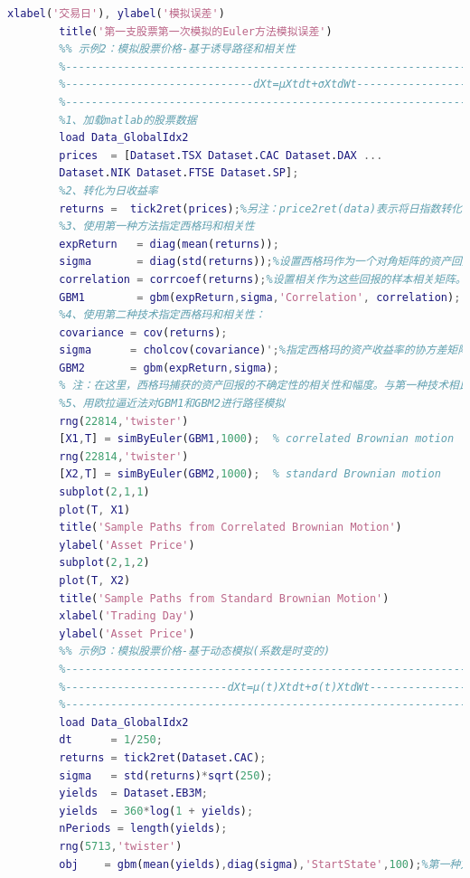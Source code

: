\begin{lstlisting}[language= Matlab]
        xlabel('交易日'), ylabel('模拟误差')
        title('第一支股票第一次模拟的Euler方法模拟误差')
        %% 示例2：模拟股票价格-基于诱导路径和相关性
        %---------------------------------------------------------------%
        %-----------------------------dXt=μXtdt+σXtdWt------------------%
        %---------------------------------------------------------------%
        %1、加载matlab的股票数据
        load Data_GlobalIdx2
        prices  = [Dataset.TSX Dataset.CAC Dataset.DAX ...
        Dataset.NIK Dataset.FTSE Dataset.SP];
        %2、转化为日收益率
        returns =  tick2ret(prices);%另注：price2ret(data)表示将日指数转化为日收益率%ret2price(data)表示将日收益率转化为日指数:)
        %3、使用第一种方法指定西格玛和相关性
        expReturn   = diag(mean(returns));
        sigma       = diag(std(returns));%设置西格玛作为一个对角矩阵的资产回报标准偏差
        correlation = corrcoef(returns);%设置相关作为这些回报的样本相关矩阵。在这种情况下，布朗运动的组件是依赖
        GBM1        = gbm(expReturn,sigma,'Correlation', correlation);
        %4、使用第二种技术指定西格玛和相关性：
        covariance = cov(returns);
        sigma      = cholcov(covariance)';%指定西格玛的资产收益率的协方差矩阵的Cholesky因子
        GBM2       = gbm(expReturn,sigma);
        % 注：在这里，西格玛捕获的资产回报的不确定性的相关性和幅度。与第一种技术相比，布朗运动的组件是独立的。此外，这种技术接受的身份矩阵的默认分配的相关性，并更简单。
        %5、用欧拉逼近法对GBM1和GBM2进行路径模拟
        rng(22814,'twister')
        [X1,T] = simByEuler(GBM1,1000);  % correlated Brownian motion
        rng(22814,'twister')
        [X2,T] = simByEuler(GBM2,1000);  % standard Brownian motion
        subplot(2,1,1)
        plot(T, X1)
        title('Sample Paths from Correlated Brownian Motion')
        ylabel('Asset Price')
        subplot(2,1,2)
        plot(T, X2)
        title('Sample Paths from Standard Brownian Motion')
        xlabel('Trading Day')
        ylabel('Asset Price')
        %% 示例3：模拟股票价格-基于动态模拟(系数是时变的)
        %---------------------------------------------------------------%
        %-------------------------dXt=μ(t)Xtdt+σ(t)XtdWt----------------%
        %---------------------------------------------------------------%
        load Data_GlobalIdx2
        dt      = 1/250;
        returns = tick2ret(Dataset.CAC);
        sigma   = std(returns)*sqrt(250);
        yields  = Dataset.EB3M;
        yields  = 360*log(1 + yields);
        nPeriods = length(yields);
        rng(5713,'twister')
        obj    = gbm(mean(yields),diag(sigma),'StartState',100);%第一种方法指定风险中性的收益为Euribor收益样本平均值，因此假定一个恒定的(非动态)无风险收益率：

\end{lstlisting}
